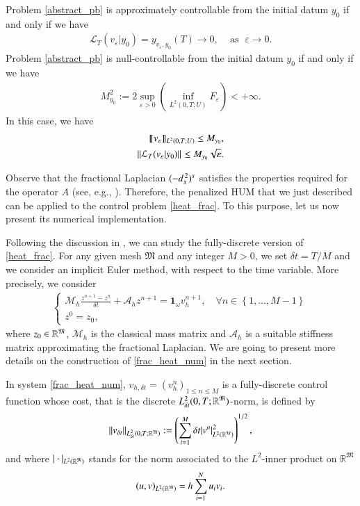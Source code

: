 \begin{theorem}\label{theorem_hum}
Problem \eqref{abstract_pb} is approximately controllable from the initial datum $y_0$ if and only if we have
\begin{align*}
	\mathcal{L}_T(v_\varepsilon|y_0) = y_{v_\varepsilon,y_0}(T)\rightarrow 0,\;\;\;\textrm{ as }\;\varepsilon\to 0.
\end{align*}
Problem \eqref{abstract_pb} is null-controllable from the initial datum $y_0$ if and only if we have
\begin{align*}
	M_{y_0}^2:=2\sup_{\varepsilon>0}\left( \inf_{L^2(0,T;U)}F_\varepsilon\right)<+\infty.
\end{align*}
In this case, we have 
\begin{align*}
	\llbracket v_\varepsilon\rrbracket_{L^2(0,T;U)}\leq M_{y_0},\nonumber
	\\
	{\left\|\mathcal L_T(v_\varepsilon|y_0)\right\|}_{}\leq M_{y_0}\sqrt{\varepsilon}.
\end{align*} 
\end{theorem} 

Observe that the fractional Laplacian $(-d_x^{\,2})^{s}$ satisfies the properties required for the operator $A$ (see, e.g., \cite[Theorem 2.14]{gal2017nonlocal}). Therefore, the penalized HUM that we just described can be applied to the control problem \eqref{heat_frac}. To this purpose, let us now present its numerical implementation. 

Following the discussion in \cite{boyer2011uniform}, we can study the fully-discrete version of \eqref{heat_frac}. For any given mesh $\mathfrak M$ and any integer $M>0$, we set $\delta t=T/M$ and we consider an implicit Euler method, with respect to the time variable. More precisely, we consider
\begin{align}\label{frac_heat_num}
	\begin{cases}
		\displaystyle\mathcal M_h \frac{z^{n+1}-z^n}{\delta t}+\mathcal A_h z^{n+1}=\mathbf{1}_\omega v_h^{n+1}, \quad \forall n\in \left\{1,\ldots,M-1\right\}
		\\
		z^0=z_0, 
	\end{cases}
\end{align}
where $z_0\in \mathbb R^{\mathfrak{M}}$, $\mathcal M_h$ is the classical mass matrix and $\mathcal A_h$ is a suitable stiffness matrix approximating the fractional Laplacian. We are going to present more details on the construction of \eqref{frac_heat_num} in the next section.

In system \eqref{frac_heat_num}, $v_{h,\delta t}=(v_h^n)_{1\leq n\leq M}$ is a fully-discrete control function whose cost, that is the discrete $L_{\delta t}^2(0,T;\mathbb R^{\mathfrak{M}})$-norm, is defined by
\begin{align*}
	{\left\|v_{\delta t}\right\|}_{L_{\delta t}^2(0,T;\mathbb R^{\mathfrak{M}})}:=\left(\sum_{i=1}^M\delta t |v^n|^2_{L^2(\mathbb{R}^{\mathfrak{M}})}\right)^{1/2},
\end{align*}
and where $| \cdot |_{L^2(\mathbb{R}^{\mathfrak{M}})}$ stands for the norm associated to the $L^2$-inner product on $\mathbb{R}^\mathfrak M$
\begin{align*}
	(u,v)_{L^2(\mathbb{R}^{\mathfrak{M}})}=h \sum_{i=1}^N u_i v_i.
\end{align*}

